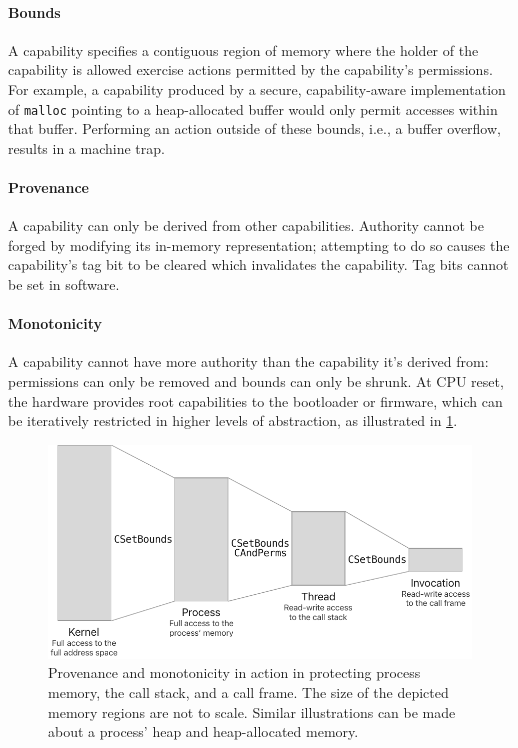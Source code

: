 \documentclass[main.tex]{subfiles}
\begin{document}
\paragraph{Bounds} A capability specifies a contiguous region of memory where the holder of the capability is allowed exercise actions permitted by the capability's permissions. For example, a capability produced by a secure, capability-aware implementation of \texttt{malloc} pointing to a heap-allocated buffer would only permit accesses within that buffer. Performing an action outside of these bounds, i.e., a buffer overflow, results in a machine trap.

\paragraph{Provenance} A capability can only be derived from other capabilities. Authority cannot be forged by modifying its in-memory representation; attempting to do so causes the capability's tag bit to be cleared which invalidates the capability. Tag bits cannot be set in software.

\paragraph{Monotonicity} A capability cannot have more authority than the capability it's derived from: permissions can only be removed and bounds can only be shrunk. At CPU reset, the hardware provides root capabilities to the bootloader or firmware, which can be iteratively restricted in higher levels of abstraction, as illustrated in \cref{fig:derivingauth}.

\begin{figure}
	\centering
	\includegraphics{Images/Deriving Authority.pdf}
	\caption{Provenance and monotonicity in action in protecting process memory, the call stack, and a call frame. The size of the depicted memory regions are not to scale. Similar illustrations can be made about a process' heap and heap-allocated memory.}
	\label{fig:derivingauth}
\end{figure}
\end{document}
